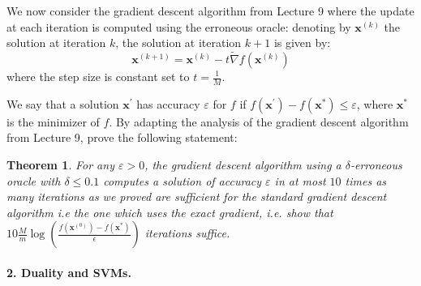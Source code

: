 \documentclass[11pt]{article}
\newcommand{\eps}{\varepsilon}
\newtheorem*{theorem*}{Theorem}
\theoremstyle{remark}
\newcommand{\bx}{\mathbf{x}}
\begin{document}
We now consider the gradient descent algorithm from Lecture 9 where the update
at each iteration is computed using the erroneous oracle: denoting by
$\bx^{(k)}$ the solution at iteration $k$, the solution at iteration $k+1$ is
given by:
\begin{displaymath}
    \bx^{(k+1)} = \bx^{(k)} - t\tilde{\nabla} f(\bx^{(k)})
\end{displaymath}
where the step size is constant set to $t=\frac{1}{M}$.

We say that a solution $\bx^{'}$ has accuracy $\eps$ for $f$ if $f(\bx^{'})
- f(\bx^*)\leq \eps$, where $\bx^*$ is the minimizer of $f$. By adapting the
analysis of the gradient descent algorithm from Lecture 9, prove the following
statement:

\begin{theorem*}
   For any $\eps > 0$, the
    gradient descent algorithm using a $\delta$-erroneous oracle with $\delta
    \leq 0.1$ computes a solution of accuracy $\eps$ in at most $10
    $ times as many
    iterations as we proved are sufficient for the standard gradient descent algorithm \emph{i.e} the one
    which uses the exact gradient, i.e. 
   show that $10 \frac{M}{m} \log \left(\frac{f(\bx^{(0)}) - f(\bx^*)}{\epsilon}\right)$ iterations suffice.
\end{theorem*}


\paragraph{2. Duality and SVMs.}
\end{document}
